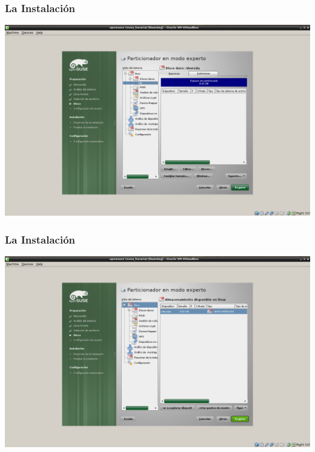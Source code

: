 \documentclass{beamer}
\begin{document}
\begin{frame}
\frametitle{La Instalaci\'on}
\includegraphics[height=0.8\textheight]{7.png} \hspace*{7.3cm}
\end{frame} 

\begin{frame}
\frametitle{La Instalaci\'on}
\includegraphics[height=0.8\textheight]{7_.png} \hspace*{7.3cm}
\end{frame} 
\end{document}
